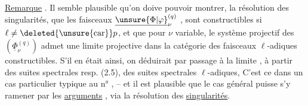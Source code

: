 
\uline{Remarque} . Il semble plausible qu'on doive pouvoir montrer,   la résolution des singularités, que les faisceaux $\underline{\unsure{\Phi|\varphi}}_\nu^{(q)}$ ,  sont constructibles si $\ell\ne\deleted{\unsure{\mathrm{car}}}p$, et que pour $\nu$ variable, le système projectif des $(\underline\Phi_\nu^{(q)})$   admet une limite projective dans la catégorie des faisceaux $\ell$-adiques constructibles. S'il en était ainsi, on déduirait par passage à la limite , à partir des suites spectrales   resp.  (2.5), des suites spectrales   $\ell$-adiques, \unsure{\S} C'est ce   dans un cas particulier typique au n° , -- et il est plausible que le cas général puisse s'y ramener par les \uline{arguments} , via la résolution des \uline{singularités}.
